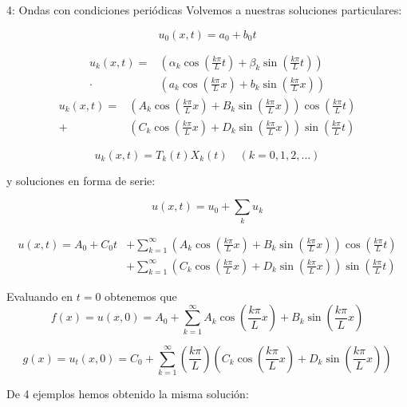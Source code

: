 \begin{example}{4: Ondas con condiciones periódicas}
			Volvemos a nuestras soluciones particulares:

			\[u_0(x,t) = a_0 + b_0t\]


			\begin{align*}
			u_k(x,t) = &\left(\alpha_k \cos \left( \frac{k \pi}{L} t \right) + \beta_k \sin \left( \frac{k \pi}{L} t \right) \right) \\
			\cdot &\left(a_k \cos \left( \frac{k \pi}{L} x \right) + b_k \sin \left( \frac{k \pi}{L} x \right) \right)
			\end{align*}
			\begin{align*}
			u_k(x,t) = &\left(A_k \cos \left( \frac{k \pi}{L} x \right) + B_k \sin \left( \frac{k \pi}{L} x \right) \right) \cos \left( \frac{k \pi}{L} t \right)\\
			+ &\left(C_k \cos \left( \frac{k \pi}{L} x \right) + D_k \sin \left( \frac{k \pi}{L} x \right) \right) \sin \left( \frac{k \pi}{L} t \right)
			\end{align*}




			\[u_k(x,t) = T_k(t) X_k(t) \quad (k=0,1,2,…)\]


			y soluciones en forma de serie:

			\[ u(x,t) = u_0 + \sum_k u_k \]

			\begin{align*}
				u(x,t) = A_0 + C_0 t &+ \sum^{\infty}_{k=1} \left(A_k \cos \left( \frac{k \pi}{L} x \right) + B_k \sin \left( \frac{k \pi}{L} x \right) \right) \cos \left( \frac{k \pi}{L} t \right)\\
				&+ \sum^{\infty}_{k=1} \left(C_k \cos \left( \frac{k \pi}{L} x \right) + D_k \sin \left( \frac{k \pi}{L} x \right) \right) \sin \left( \frac{k \pi}{L} t \right)
			\end{align*}

			Evaluando en $t = 0$ obtenemos que
			\[f(x) = u(x,0) = A_0 + \sum_{k=1}^{\infty} A_k \cos \left( \frac{k \pi}{L} x \right) + B_k \sin \left( \frac{k \pi}{L} x \right) \]

			\[g(x) = u_t (x,0) = C_0 + \sum_{k=1}^{\infty} \left(\frac{k \pi}{L}\right) \left( C_k \cos \left( \frac{k \pi}{L} x \right) + D_k \sin \left( \frac{k \pi}{L} x \right)\right) \]


		\end{example}

		De 4 ejemplos hemos obtenido la misma solución:

